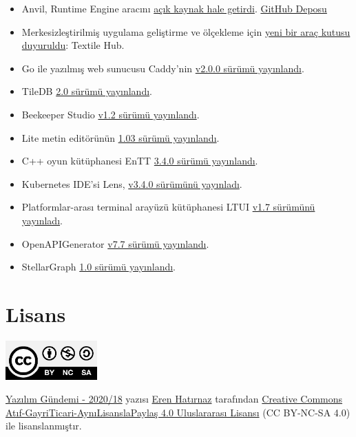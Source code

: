 \documentclass[11pt]{article}
\begin{document}
\begin{itemize}
\item Anvil, Runtime Engine aracını \href{https://anvil.works/blog/open-source}{açık kaynak hale getirdi}. \href{https://github.com/anvil-works/anvil-runtime}{GitHub Deposu}
\item Merkesizleştirilmiş uygulama geliştirme ve ölçekleme için \href{https://blog.textile.io/announcing-the-textile-protocol-hub/}{yeni bir araç
kutusu duyuruldu}: Textile Hub.
\item Go ile yazılmış web sunucusu Caddy'nin \href{https://github.com/caddyserver/caddy/releases/tag/v2.0.0}{v2.0.0 sürümü yayınlandı}.
\item TileDB \href{https://medium.com/tiledb/tiledb-2-0-and-the-future-of-data-science-929cdcfe95ed}{2.0 sürümü yayınlandı}.
\item Beekeeper Studio \href{https://www.beekeeperstudio.io/blog/release-1.2}{v1.2 sürümü yayınlandı}.
\item Lite metin editörünün \href{https://github.com/rxi/lite/releases/tag/v1.03}{1.03 sürümü yayınlandı}.
\item C++ oyun kütüphanesi EnTT \href{https://github.com/skypjack/entt/releases/tag/v3.4.0}{3.4.0 sürümü yayınlandı}.
\item Kubernetes IDE'si Lens, \href{https://github.com/lensapp/lens/releases}{v3.4.0 sürümünü yayınladı}.
\item Platformlar-arası terminal arayüzü kütüphanesi LTUI \href{https://github.com/tboox/ltui/wiki/LTUI-v1.7-released,-A-cross-platform-terminal-ui-library-based-on-Lua}{v1.7 sürümünü yayınladı}.
\item OpenAPIGenerator \href{https://mobile.twitter.com/oas\_generator/status/1258057660974329861}{v7.7 sürümü yayınlandı}.
\item StellarGraph \href{https://medium.com/stellargraph/stellargraph-1-0-taking-graph-machine-learning-to-a-new-level-2bd6a04fbc77}{1.0 sürümü yayınlandı}.
\end{itemize}
\section{Lisans}
\label{sec:org921ba9e}
\begin{center}
\begin{center}
\includegraphics[height=1.5cm]{../../../img/CC_BY-NC-SA_4.0.png}
\end{center}

\href{yazilim-gundemi-2020-18.pdf}{Yazılım Gündemi - 2020/18} yazısı \href{https://erenhatirnaz.github.io}{Eren Hatırnaz} tarafından \href{http://creativecommons.org/licenses/by-nc-sa/4.0/}{Creative Commons
Atıf-GayriTicari-AynıLisanslaPaylaş 4.0 Uluslararası Lisansı} (CC BY-NC-SA 4.0)
ile lisanslanmıştır.
\end{center}
\end{document}
